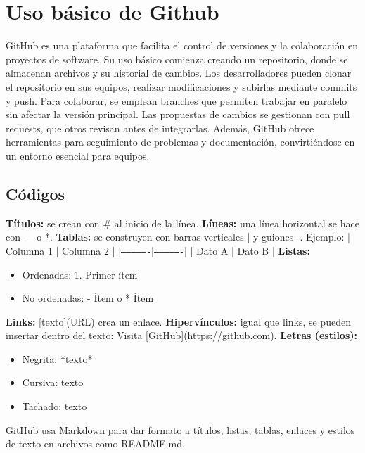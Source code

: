 \documentclass[runningheads]{llncs}
\begin{document}
\section{Uso básico de Github}
GitHub es una plataforma que facilita el control de versiones y la colaboración en proyectos de software. Su uso básico comienza creando un repositorio, donde se almacenan archivos y su historial de cambios. Los desarrolladores pueden clonar el repositorio en sus equipos, realizar modificaciones y subirlas mediante commits y push. Para colaborar, se emplean branches que permiten trabajar en paralelo sin afectar la versión principal. Las propuestas de cambios se gestionan con pull requests, que otros revisan antes de integrarlas. Además, GitHub ofrece herramientas para seguimiento de problemas y documentación, convirtiéndose en un entorno esencial para equipos.  

\subsection{Códigos}
\textbf{Títulos:} se crean con \# al inicio de la línea. 
\newline\textbf{Líneas:} una línea horizontal se hace con --- o *. 
\newline\textbf{Tablas:} se construyen con barras verticales | y guiones -. \newline Ejemplo:  
  \newline| Columna 1 | Columna 2 |
  \newline|\texttt{----------------}|\texttt{----------------}|
  \newline| Dato A    | Dato B    |
\newline\textbf{Listas:} 
  \begin{itemize}
      \item Ordenadas: 1. Primer ítem
      \item No ordenadas: - Ítem o * Ítem
  \end{itemize}
\textbf{Links:} [texto](URL) crea un enlace.  
\newline\textbf{Hipervínculos:} igual que links, se pueden insertar dentro del texto: Visita [GitHub](https://github.com).  
\newline\textbf{Letras (estilos):}  
  \begin{itemize}
      \item Negrita: *texto*
      \item Cursiva: texto
      \item Tachado: \texttt{}texto\texttt{}
  \end{itemize}
GitHub usa Markdown para dar formato a títulos, listas, tablas, enlaces y estilos de texto en archivos como README.md.
\end{document}

